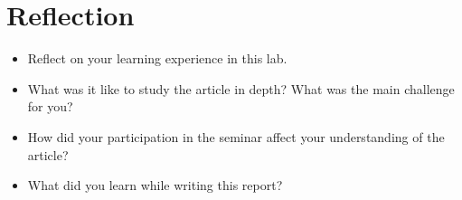 \documentclass[a4paper,12pt]{article}
\begin{document}
\section{Reflection}

\begin{itemize}
\item Reflect on your learning experience in this lab.
\item What was it like to study the article in depth? What was the main challenge for you? 
\item How did your participation in the seminar affect your understanding of the article?
\item What did you learn while writing this report?
\end{itemize}

  
\end{document}
